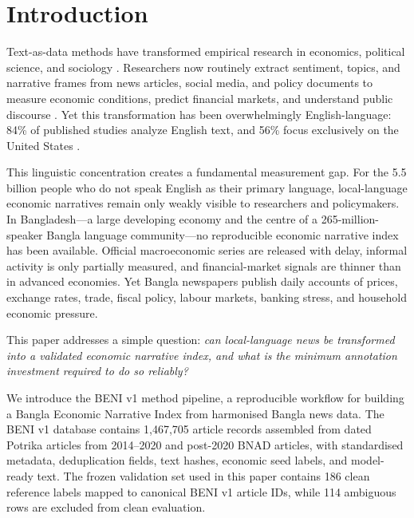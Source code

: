 
\section{Introduction}

Text-as-data methods have transformed empirical research in economics, political science, and sociology \citep{gentzkow2019text, grimmer2019text}. Researchers now routinely extract sentiment, topics, and narrative frames from news articles, social media, and policy documents to measure economic conditions, predict financial markets, and understand public discourse \citep{tetlock2007sad, baker2016measuring}. Yet this transformation has been overwhelmingly English-language: 84\% of published studies analyze English text, and 56\% focus exclusively on the United States \citep{nabil2026economic}.

This linguistic concentration creates a fundamental measurement gap. For the 5.5 billion people who do not speak English as their primary language, local-language economic narratives remain only weakly visible to researchers and policymakers. In Bangladesh---a large developing economy and the centre of a 265-million-speaker Bangla language community---no reproducible economic narrative index has been available. Official macroeconomic series are released with delay, informal activity is only partially measured, and financial-market signals are thinner than in advanced economies. Yet Bangla newspapers publish daily accounts of prices, exchange rates, trade, fiscal policy, labour markets, banking stress, and household economic pressure.

This paper addresses a simple question: \textit{can local-language news be transformed into a validated economic narrative index, and what is the minimum annotation investment required to do so reliably?}

We introduce the BENI v1 method pipeline, a reproducible workflow for building a Bangla Economic Narrative Index from harmonised Bangla news data. The BENI v1 database contains 1,467,705 article records assembled from dated Potrika articles from 2014--2020 and post-2020 BNAD articles, with standardised metadata, deduplication fields, text hashes, economic seed labels, and model-ready text. The frozen validation set used in this paper contains 186 clean reference labels mapped to canonical BENI v1 article IDs, while 114 ambiguous rows are excluded from clean evaluation.

